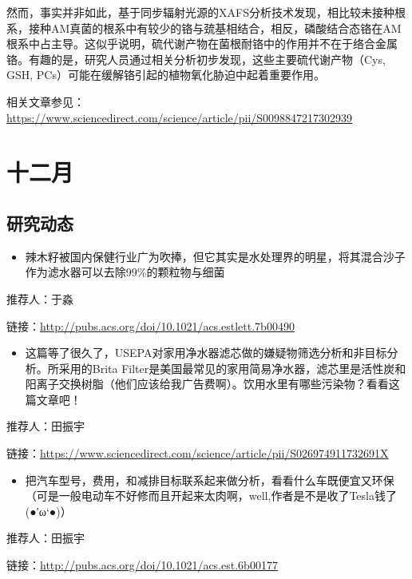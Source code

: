 \documentclass[]{book}
\providecommand{\tightlist}{%
  \setlength{\itemsep}{0pt}\setlength{\parskip}{0pt}}
\begin{document}
然而，事实并非如此，基于同步辐射光源的XAFS分析技术发现，相比较未接种根系，接种AM真菌的根系中有较少的铬与巯基相结合，相反，磷酸结合态铬在AM根系中占主导。这似乎说明，硫代谢产物在菌根耐铬中的作用并不在于络合金属铬。有趣的是，研究人员通过相关分析初步发现，这些主要硫代谢产物（Cys,
GSH, PCs）可能在缓解铬引起的植物氧化胁迫中起着重要作用。

相关文章参见：\url{https://www.sciencedirect.com/science/article/pii/S0098847217302939}

\section*{十二月}

\subsection*{研究动态}\label{-1}

\begin{itemize}
\tightlist
\item
  辣木籽被国内保健行业广为吹捧，但它其实是水处理界的明星，将其混合沙子作为滤水器可以去除99\%的颗粒物与细菌
\end{itemize}

推荐人：于淼

链接：\url{http://pubs.acs.org/doi/10.1021/acs.estlett.7b00490}

\begin{itemize}
\tightlist
\item
  这篇等了很久了，USEPA对家用净水器滤芯做的嫌疑物筛选分析和非目标分析。所采用的Brita
  Filter是美国最常见的家用简易净水器，滤芯里是活性炭和阳离子交换树脂（他们应该给我广告费啊）。饮用水里有哪些污染物？看看这篇文章吧！
\end{itemize}

推荐人：田振宇

链接：\url{https://www.sciencedirect.com/science/article/pii/S026974911732691X}

\begin{itemize}
\tightlist
\item
  把汽车型号，费用，和减排目标联系起来做分析，看看什么车既便宜又环保（可是一般电动车不好修而且开起来太肉啊，well,作者是不是收了Tesla钱了
  (●′ω`●)）
\end{itemize}

推荐人：田振宇

链接：\url{http://pubs.acs.org/doi/10.1021/acs.est.6b00177}
\end{document}
